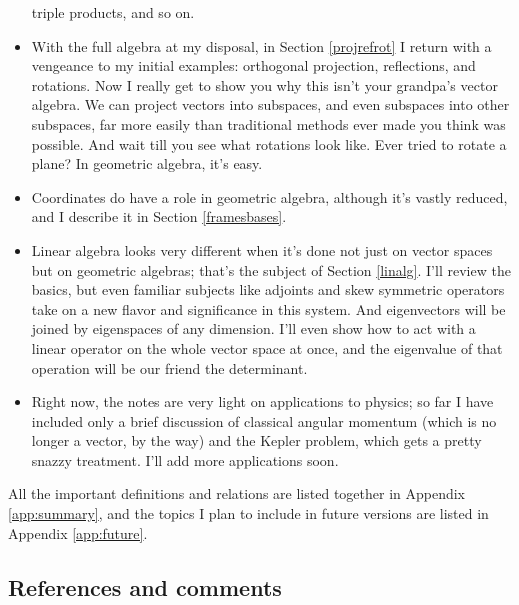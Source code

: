 \documentclass{utarticle}
\begin{document}
\begin{itemize}
          triple products, and so on.  
\item With the full algebra at my disposal, in Section \ref{projrefrot} I return with a vengeance 
          to my initial examples: orthogonal projection, reflections, and rotations.  
          Now I really get to show you why this isn't your grandpa's vector algebra.  We can project 
          vectors into subspaces, and even subspaces into other subspaces, far more easily than 
          traditional methods ever made you think was possible.  And wait till you see what rotations 
          look like.  Ever tried to rotate a plane?  In geometric algebra, it's easy.
\item Coordinates do have a role in geometric algebra, although it's vastly reduced, and I
          describe it in Section \ref{framesbases}.
\item Linear algebra looks very different when it's done not just on vector spaces but on 
          geometric algebras; that's the subject of Section \ref{linalg}.  I'll review the basics, but
          even familiar subjects like adjoints and skew symmetric operators take on a new flavor
          and significance in this system.  And eigenvectors will be joined by eigenspaces of any
          dimension.  I'll even show how to act with a linear operator on the whole vector space 
          at once, and the eigenvalue of that operation will be our friend the determinant.
\item Right now, the notes are very light on applications to physics; so far I have included only 
          a brief discussion of classical angular momentum (which is no longer a vector, by the way) 
          and the Kepler problem, which gets a pretty snazzy treatment.  I'll add more 
          applications soon.
\end{itemize}
All the important definitions and relations are listed together in Appendix 
\ref{app:summary}, and the topics I plan to include in future versions are listed in 
Appendix \ref{app:future}.

\subsection{References and comments}
\label{refs}
\end{document}
